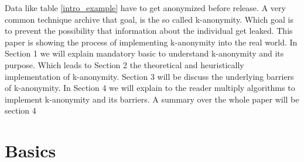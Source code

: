 \documentclass{llncs}
\begin{document}
Data like table \ref{intro_example} have to get anonymized before release. A very common technique archive that goal, is the so called k-anonymity. Which goal is to prevent the possibility that information about the individual get leaked.
This paper is showing the process of implementing k-anonymity into the real world.
In Section 1 we will explain mandatory basic to understand k-anonymity and its purpose. Which leads to Section 2 the theoretical and heuristically implementation of k-anonymity. Section 3 will be discuss the underlying barriers of k-anonymity. 
In Section 4 we will explain to the reader multiply algorithms to implement k-anonymity and its barriers. A summary over the whole paper will be section 4



\newpage
\section{Basics}
\end{document}
